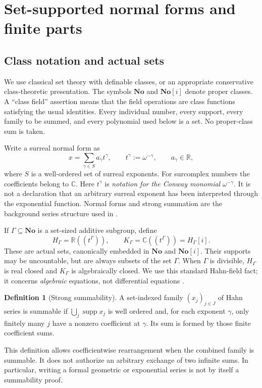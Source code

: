 \documentclass[11pt,a4paper]{article}
\theoremstyle{definition}
\newtheorem{definition}[theorem]{Definition}
\newcommand{\No}{\mathbf{No}}
\newcommand{\SC}{\mathbf{No}[i]}
\newcommand{\R}{\mathbb R}
\newcommand{\C}{\mathbb C}
\newcommand{\supp}{\operatorname{supp}}
\numberwithin{equation}{section}
\begin{document}
\section{Set-supported normal forms and finite parts}\label{sec:support}

\subsection{Class notation and actual sets}
We use classical set theory with definable classes, or an appropriate
conservative class-theoretic presentation. The symbols $\No$ and $\SC$
denote proper classes. A ``class field'' assertion means that the field
operations are class functions satisfying the usual identities. Every
individual number, every support, every family to be summed, and every
polynomial used below is a set. No proper-class sum is taken.

Write a surreal normal form as
\begin{equation}\label{eq:hahn}
 x=\sum_{\gamma\in S}a_\gamma t^\gamma,
 \qquad t^\gamma:=\omega^{-\gamma},\qquad a_\gamma\in\R,
\end{equation}
where $S$ is a well-ordered set of surreal exponents. For surcomplex numbers
the coefficients belong to $\C$. Here $t^\gamma$ is \emph{notation for the
Conway monomial} $\omega^{-\gamma}$. It is not a declaration that an
arbitrary surreal exponent has been interpreted through the exponential
function. Normal forms and strong summation are the background series
structure used in \cite{BM,ADH}.

If $\Gamma\subseteq\No$ is a set-sized additive subgroup, define
\[
 H_\Gamma=\R((t^\Gamma)),\qquad
 K_\Gamma=\C((t^\Gamma))=H_\Gamma[i].
\]
These are actual sets, canonically embedded in $\No$ and $\SC$. Their
supports may be uncountable, but are always subsets of the set $\Gamma$.
When $\Gamma$ is divisible, $H_\Gamma$ is real closed and $K_\Gamma$ is
algebraically closed. We use this standard Hahn-field fact; it concerns
\emph{algebraic} equations, not differential equations \cite{ADH}.

\begin{definition}[Strong summability]\label{def:summable}
A set-indexed family $(x_j)_{j\in J}$ of Hahn series is summable if
$\bigcup_j\supp x_j$ is well ordered and, for each exponent $\gamma$, only
finitely many $j$ have a nonzero coefficient at $\gamma$. Its sum is formed
by those finite coefficient sums.
\end{definition}
This definition allows coefficientwise rearrangement when the combined
family is summable. It does not authorize an arbitrary exchange of two
infinite sums. In particular, writing a formal geometric or exponential
series is not by itself a summability proof.
\end{document}
